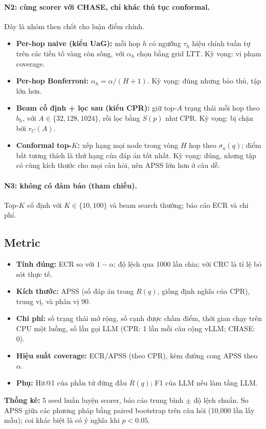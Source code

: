 \documentclass[11pt,a4paper]{article}
\theoremstyle{remark}
\newcommand{\method}{\textsc{CHASE}}
\begin{document}
\paragraph{N2: cùng scorer với \method{}, chỉ khác thủ tục conformal.} Đây là nhóm then chốt cho luận điểm chính.
\begin{itemize}[nosep]
  \item \textbf{Per-hop naive (kiểu UaG):} mỗi hop $h$ có ngưỡng $\tau_h$ hiệu chỉnh tuần tự trên các tiền tố vàng còn sống, với $\alpha_h$ chọn bằng grid LTT. Kỳ vọng: vi phạm coverage.
  \item \textbf{Per-hop Bonferroni:} $\alpha_h=\alpha/(H+1)$. Kỳ vọng: đúng nhưng bảo thủ, tập lớn hơn.
  \item \textbf{Beam cố định + lọc sau (kiểu CPR):} giữ top-$A$ trạng thái mỗi hop theo $b_h$, với $A\in\{32,128,1024\}$, rồi lọc bằng $S(p)$ như CPR. Kỳ vọng: bị chặn bởi $r_C(A)$.
  \item \textbf{Conformal top-$K$:} xếp hạng mọi node trong vòng $H$ hop theo $\sigma_a(q)$; điểm bất tương thích là thứ hạng của đáp án tốt nhất. Kỳ vọng: đúng, nhưng tập có cùng kích thước cho mọi câu hỏi, nên APSS lớn hơn ở câu dễ.
\end{itemize}

\paragraph{N3: không có đảm bảo (tham chiếu).} Top-$K$ cố định với $K\in\{10,100\}$ và beam search thường; báo cáo ECR và chi phí.

\subsection{Metric}
\begin{itemize}[nosep]
  \item \textbf{Tính đúng:} ECR so với $1-\alpha$; độ lệch qua 1000 lần chia; với CRC là tỉ lệ bỏ sót thực tế.
  \item \textbf{Kích thước:} APSS (số đáp án trong $R(q)$, giống định nghĩa của CPR), trung vị, và phân vị 90.
  \item \textbf{Chi phí:} số trạng thái mở rộng, số cạnh được chấm điểm, thời gian chạy trên CPU một luồng, số lần gọi LLM (CPR: 1 lần mỗi câu cộng vLLM; \method: 0).
  \item \textbf{Hiệu suất coverage:} ECR/APSS (theo CPR), kèm đường cong APSS theo $\alpha$.
  \item \textbf{Phụ:} Hit@1 của phần tử đứng đầu $R(q)$; F1 của LLM nếu làm tầng LLM.
\end{itemize}
\textbf{Thống kê:} 5 seed huấn luyện scorer, báo cáo trung bình $\pm$ độ lệch chuẩn. So APSS giữa các phương pháp bằng paired bootstrap trên câu hỏi (10{,}000 lần lấy mẫu); coi khác biệt là có ý nghĩa khi $p<0.05$.
\end{document}
